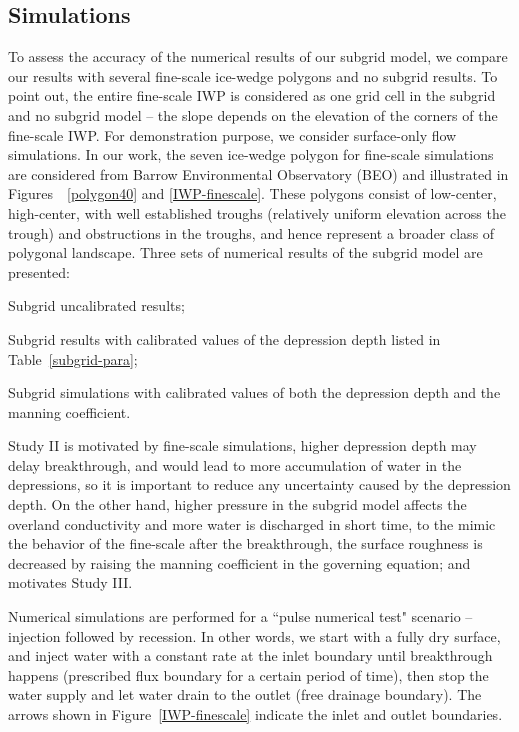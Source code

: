 \documentclass[review,11pt]{elsarticle}
\begin{document}
\subsection{Simulations}
To assess the accuracy of the numerical results of our subgrid model, we compare our results with several fine-scale ice-wedge polygons and no subgrid results. To point out, the entire fine-scale IWP is considered as one grid cell in the subgrid and no subgrid model -- the slope depends on the elevation of the corners of the fine-scale IWP. For demonstration purpose, we consider surface-only flow simulations. In our work, the seven ice-wedge polygon for fine-scale simulations are considered from Barrow Environmental Observatory (BEO) and illustrated in Figures~~\ref{polygon40} and \ref{IWP-finescale}. These polygons consist of low-center, high-center, with well established troughs (relatively uniform elevation across the trough) and obstructions in the troughs, and hence represent a broader class of polygonal landscape. Three sets of numerical results of the subgrid model are presented:
\begin{description}\itemsep0pt \parskip0pt
\item [Study I:] Subgrid uncalibrated results;
\item [Study II:] Subgrid results with calibrated values of the depression depth listed in Table~\ref{subgrid-para};
\item [Study III:] Subgrid simulations with calibrated values of both the depression depth and the manning coefficient.
\end{description}

Study II is motivated by fine-scale simulations, higher depression depth may delay breakthrough, and would lead to more accumulation of water in the depressions, so it is important to reduce any uncertainty caused by the depression depth. On the other hand, higher pressure in the subgrid model affects the overland conductivity and more water is discharged in short time, to the mimic the behavior of the fine-scale after the breakthrough, the surface roughness is decreased by raising the manning coefficient in the governing equation; and motivates Study III.

Numerical simulations are performed for a  ``pulse numerical test" scenario -- injection followed by recession. In other words, we start with a fully dry surface, and inject water with a constant rate at the inlet boundary until breakthrough happens (prescribed flux boundary for a certain period of time), then stop the water supply and let water drain to the outlet (free drainage boundary). The arrows shown in Figure~\ref{IWP-finescale} indicate the inlet and outlet boundaries.
\end{document}
